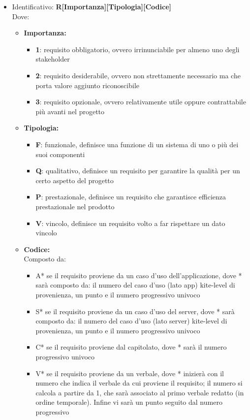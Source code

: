 \begin{itemize}
	\item Identificativo: \textbf{R[Importanza][Tipologia][Codice]}\\
Dove:
\begin{itemize}
		\item \textbf{Importanza:}
		\begin{itemize}
			\item \textbf{1}: requisito obbligatorio, ovvero irrinunciabile per almeno uno degli stakeholder
			\item \textbf{2}: requisito desiderabile, ovvero non strettamente necessario ma che porta valore aggiunto riconoscibile
			\item \textbf{3}: requisito opzionale, ovvero relativamente utile oppure contrattabile più avanti nel progetto
		\end{itemize}
		\item \textbf{Tipologia:}
		\begin{itemize}
			\item \textbf{F}: funzionale, definisce una funzione di un sistema di uno o più dei suoi componenti
			\item \textbf{Q}: qualitativo, definisce un requisito per garantire la qualità per un certo aspetto del progetto
			\item \textbf{P}: prestazionale, definisce un requisito che garantisce efficienza prestazionale nel prodotto
			\item \textbf{V}: vincolo, definisce un requisito volto a far rispettare un dato vincolo
		\end{itemize}
		\item \textbf{Codice:}\\
		Composto da:
		\begin{itemize}
			\item A* se il requisito proviene da un caso d'uso dell'applicazione, dove * sarà composto da: il numero del caso d'uso (lato app) kite-level di provenienza, un punto e il numero progressivo univoco
			\item S* se il requisito proviene da un caso d'uso del server, dove * sarà composto da: il numero del caso d'uso (lato server) kite-level di provenienza, un punto e il numero progressivo univoco
			\item C* se il requisito proviene dal capitolato, dove * sarà il numero progressivo univoco
			\item V* se il requisito proviene da un verbale, dove * inizierà con il numero che indica il verbale da cui proviene il requisito; il numero si calcola a partire da 1, che sarà associato al primo verbale redatto (in ordine temporale). Infine vi sarà un punto seguito dal numero progressivo

\end{itemize}
\end{itemize}
\end{itemize}
